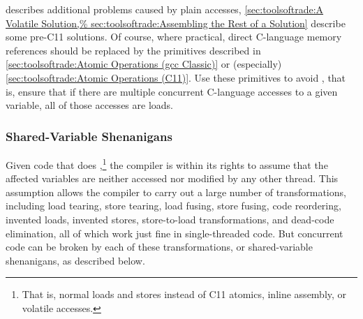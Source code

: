 describes additional problems caused by plain accesses,
\cref{sec:toolsoftrade:A Volatile Solution,%
sec:toolsoftrade:Assembling the Rest of a Solution}
describe some pre-C11 solutions.
Of course, where practical, direct C-language memory references
should be replaced by the primitives described in
\cref{sec:toolsoftrade:Atomic Operations (gcc Classic)}
or (especially)
\cref{sec:toolsoftrade:Atomic Operations (C11)}.
Use these primitives to avoid , that is, ensure that if
there are multiple concurrent C-language accesses to a given variable,
all of those accesses are loads.

\subsubsection{Shared-Variable Shenanigans}
\label{sec:toolsoftrade:Shared-Variable Shenanigans}
%
Given code that does ,\footnote{
	That is, normal loads and stores instead of C11 atomics, inline
	assembly, or volatile accesses.}
the compiler is within
its rights to assume that the affected variables are neither accessed
nor modified by any other thread.
This assumption allows the compiler to carry out a large number of
transformations, including load tearing, store tearing,
load fusing, store fusing, code reordering, invented loads,
invented stores, store-to-load transformations, and dead-code elimination,
all of which work just fine in single-threaded code.
But concurrent code can be broken by each of these transformations,
or shared-variable shenanigans, as described below.

